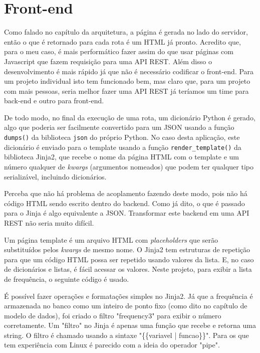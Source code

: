 \chapter{Front-end}

Como falado no capítulo da arquitetura, a página é gerada no lado do servidor, então o que 
é retornado para cada rota é um HTML já pronto. Acredito que, para o meu caso, é mais 
performático fazer assim do que usar páginas com Javascript que fazem requisição para uma API REST.
Além disso o desenvolvimento é mais rápido já que não é necessário codificar o front-end.
Para um projeto individual isto tem funcionado bem, mas claro que, para um projeto com
mais pessoas, seria melhor fazer uma API REST já teríamos um time para back-end e outro
para front-end.

De todo modo, no final da execução de uma rota, um dicionário Python é gerado, algo que 
poderia ser facilmente convertido para um JSON usando a função \texttt{dumps()} da 
biblioteca \texttt{json} do próprio Python. No caso desta aplicação, este dicionário é 
enviado para o template usando a função \texttt{render\_template()} da biblioteca Jinja2, 
que recebe o nome da página HTML com o template e um número qualquer de \textit{kwargs} (argumentos nomeados) 
que podem ter qualquer tipo serializável, incluindo dicionários.

Perceba que não há problema de acoplamento fazendo deste modo, pois não há código HTML sendo 
escrito dentro do backend. Como já dito, o que é passado para o Jinja é algo equivalente a JSON.
Transformar este backend em uma API REST não seria muito difícil.

Um página template é um arquivo HTML com \textit{placeholders} que serão substituídos pelos 
\textit{kwargs} de mesmo nome. O Jinja2 tem estruturas de repetição para que um código HTML 
possa ser repetido usando valores da lista. E, no caso de dicionários e listas, é fácil acessar 
os valores. Neste projeto, para exibir a lista de frequência, o seguinte código é usado.



É possível fazer operações e formatações simples no Jinja2. Já que a frequência 
é armazenada no banco como um inteiro de ponto fixo (como dito no capítulo de modelo de dados), 
foi criado o filtro "frequency3" para exibir o número corretamente. Um "filtro" no Jinja 
é apenas uma função que recebe e retorna
uma string. O filtro é chamado usando a sintaxe "\{\{variavel | funcao\}\}". Para os que tem
experiência com Linux é parecido com a ideia do operador "pipe".


